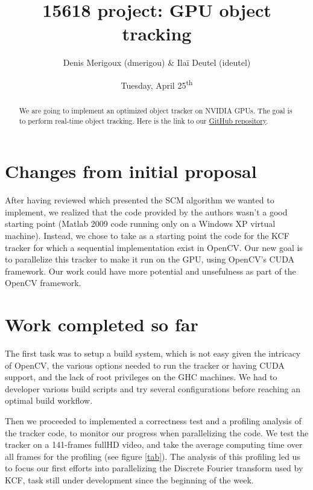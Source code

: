 \documentclass[11pt,english,letter]{article}
\title{15618 project: GPU object tracking}
\author{Denis Merigoux (dmerigou) \& Ilaï Deutel (ideutel)}
\date{Tuesday, April 25\textsuperscript{th}}
\begin{document}
\maketitle


\begin{abstract}
We are going to implement an optimized object tracker on NVIDIA GPUs. The goal is to perform real-time object tracking. Here is the link to our \href{https://github.com/denismerigoux/GPU-tracking}{GitHub repository}.
\end{abstract}

\section{Changes from initial proposal}

After having reviewed \cite{6247882} which presented the SCM algorithm we wanted to implement, we realized that the code provided by the authors wasn't a good starting point (Matlab 2009 code running only on a Windows XP virtual machine). Instead, we chose to take as a starting point the code for the KCF tracker \cite{DBLP:journals/corr/HenriquesCMB14} for which a sequential implementation exist in OpenCV. Our new goal is to parallelize this tracker to make it run on the GPU, using OpenCV's CUDA framework. Our work could have more potential and unsefulness as part of the OpenCV framework.

\section{Work completed so far}

The first task was to setup a build system, which is not easy given the intricacy of OpenCV, the various options needed to run the tracker or having CUDA support, and the lack of root privileges on the GHC machines. We had to developer various build scripts and try several configurations before reaching an optimal build workflow.

Then we proceeded to implemented a correctness test and a profiling analysis of the tracker code, to monitor our progress when parallelizing the code. We test the tracker on a 141-frames fullHD video, and take the average computing time over all frames for the profiling (see figure \ref{tab}). The analysis of this profiling led us to focus our first efforts into parallelizing the Discrete Fourier transform used by KCF, task still under development since the beginning of the week.
\end{document}
